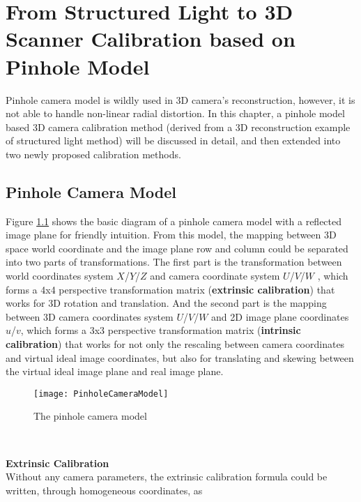 \chapter{From Structured Light to 3D Scanner Calibration based on Pinhole Model} %
\label{sens_PinHoleCameraStructuredLight} %
Pinhole camera model is wildly used in 3D camera's reconstruction, however, it is not able to handle non-linear radial distortion. In this chapter, a pinhole model based 3D camera calibration method (derived from a 3D reconstruction example of structured light method) will be discussed in detail, and then extended into two newly proposed calibration methods.


\section{Pinhole Camera Model}
\label{sectionPinholeCamera}
Figure \ref{PinholeCameraModel} shows the basic diagram of a pinhole camera model \cite{Maria10} \cite{Zhengyou04} with a reflected image plane for friendly intuition. From this model, the mapping between 3D space world coordinate and the image plane row and column could be separated into two parts of transformations. The first part is the transformation between world coordinates system \(X\)/\(Y\)/\(Z\) and camera coordinate system \(U\)/\(V\)/\(W\) , which forms a 4x4 perspective transformation matrix (\textbf{extrinsic calibration}) that works for 3D rotation and translation. And the second part is the mapping between 3D camera coordinates system \(U\)/\(V\)/\(W\) and 2D image plane coordinates \(u\)/\(v\), which forms a 3x3 perspective transformation matrix (\textbf{intrinsic calibration}) that works for not only the rescaling between camera coordinates and virtual ideal image coordinates, but also for translating and skewing between the virtual ideal image plane and real image plane. %
%
\begin{figure}[h]
\centering
\texttt{[image: PinholeCameraModel]}
\caption{The pinhole camera model}
\label{PinholeCameraModel}
\end{figure}%
%
\\\par%
\textbf{Extrinsic Calibration}\\
Without any camera parameters, the extrinsic calibration formula could be written, through homogeneous coordinates, as

